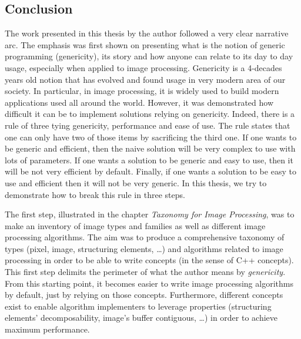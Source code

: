 \subsection*{Conclusion}


The work presented in this thesis by the author followed a very clear narrative arc. The emphasis was first shown on
presenting what is the notion of generic programming (genericity), its story and how anyone can relate to its day to day
usage, especially when applied to image processing. Genericity is a 4-decades years old notion that has evolved and
found usage in very modern area of our society. In particular, in image processing, it is widely used to build modern
applications used all around the world. However, it was demonstrated how difficult it can be to implement solutions
relying on genericity. Indeed, there is a rule of three tying genericity, performance and ease of use. The rule states
that one can only have two of those items by sacrificing the third one. If one wants to be generic and efficient, then
the naive solution will be very complex to use with lots of parameters. If one wants a solution to be generic and easy
to use, then it will be not very efficient by default. Finally, if one wants a solution to be easy to use and efficient
then it will not be very generic. In this thesis, we try to demonstrate how to break this rule in three steps.

The first step, illustrated in the chapter \emph{Taxonomy for Image Processing}, was to make an inventory of image types
and families as well as different image processing algorithms. The aim was to produce a comprehensive taxonomy of types
(pixel, image, structuring elements, \ldots) and algorithms related to image processing in order to be able to write
concepts (in the sense of C++ concepts). This first step delimits the perimeter of what the author means by
\emph{genericity}. From this starting point, it becomes easier to write image processing algorithms by default, just by
relying on those concepts. Furthermore, different concepts exist to enable algorithm implementers to leverage properties
(structuring elements' decomposability, image's buffer contiguous, \ldots) in order to achieve maximum performance.

